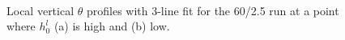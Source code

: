 \begin{figure}[htbp]
\begin{minipage}[b]{0.5\linewidth}
        \\
        \end{minipage}             
\quad
\begin{minipage}[b]{0.5\linewidth}
       
       \end{minipage}
\caption[High local ML ]{Local vertical $\theta$ profiles with 3-line fit for the 60/2.5 run at a point where $h^{l}_{0}$ (a) is high and (b) low.}
        
        \label{fig:rssfitshigh}
\end{figure}

